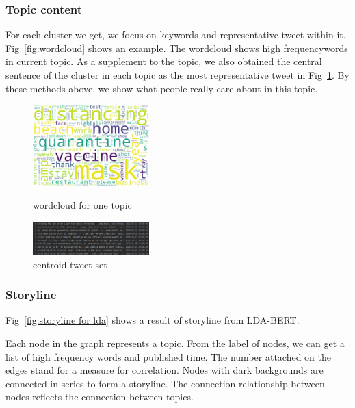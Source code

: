 \subsubsection{Topic content}
For each cluster we get, we focus on keywords and representative tweet within it. Fig~\ref{fig:wordcloud} shows an example. The wordcloud shows high frequencywords in current topic. As a supplement to the topic, we also obtained the central sentence of the cluster in each topic as the most representative tweet in Fig~\ref{fig:center_sentence}. By these methods above, we show what people really care about in this topic.
\begin{figure}
\centering
{
\includegraphics[width=0.4\textwidth]{imgs/lda_bert/Topic0_wordcloud.png}
\caption{wordcloud for one topic}
\label{fig:wordcloud}
}
\hspace{10pt}    
{
\includegraphics[width=0.4\textwidth]{imgs/lda_bert/center_sentence.png}
\caption{centroid tweet set}
\label{fig:center_sentence}
}
\hspace{10pt}
\end{figure}


\subsubsection{Storyline}
Fig~\ref{fig:storyline for lda} shows a result of storyline from LDA-BERT.  

Each node in the graph represents a topic. From the label of nodes, we can get a list of high frequency words and published time. The number attached on the edges stand for a measure for correlation. Nodes with dark backgrounds are connected in series to form a storyline. The connection relationship between nodes reflects the connection between topics.

